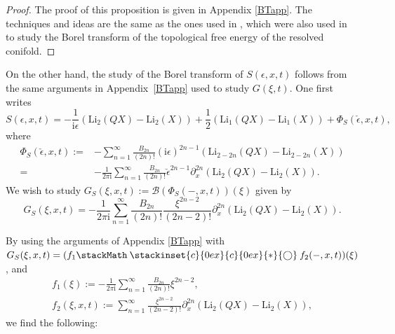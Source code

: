 \documentclass[pdftex]{sigma}
\newcommand\oast{\stackMath\mathbin{\stackinset{c}{0ex}{c}{0ex}{\ast}{\bigcirc}}}
\numberwithin{equation}{section}
\begin{document}
\begin{proof} The proof of this proposition is given in Appendix \ref{BTapp}. The techniques and ideas are the same as the ones used in \cite{garoufalidis2020resurgence}, which were also used in~\cite{ASTT21} to study the Borel transform of the topological free energy of the resolved conifold.
\end{proof}

On the other hand, the study of the Borel transform of $S(\epsilon,x,t)$ follows from the same arguments in Appendix~\ref{BTapp} used to study $G(\xi,t)$. One first writes
\begin{equation*}
 S(\epsilon,x,t)=-\frac{1}{\mathrm{i}\epsilon}(\mathrm{Li}_2(QX)-\mathrm{Li}_2(X)) +\frac{1}{2}(\mathrm{Li}_1(QX)-\mathrm{Li}_1(X)) + \Phi_S(\check\epsilon,x,t),
\end{equation*}
where
\begin{align*}
 \Phi_S(\check\epsilon,x,t):={}&{-}\sum_{n=1}^{\infty}\frac{B_{2n}}{(2n)!}(\mathrm{i}\epsilon)^{2n-1}(\mathrm{Li}_{2-2n}(QX)-\mathrm{Li}_{2-2n}(X))\\
={}&{-}\frac{1}{2\pi \mathrm{i}}\sum_{n=1}^{\infty}\frac{B_{2n}}{(2n)!}\check{\epsilon}^{2n-1}\partial_x^{2n}(\mathrm{Li}_{2}(QX)-\mathrm{Li}_{2}(X)).
 \end{align*}
We wish to study $G_S(\xi,x,t):=\mathcal{B}(\Phi_S(-,x,t))(\xi)$ given by
\begin{equation}\label{BoreltransS}
 G_S(\xi,x,t)=-\frac{1}{2\pi \mathrm{i}}\sum_{n=1}^{\infty}\frac{B_{2n}}{(2n)!}\frac{\xi^{2n-2}}{(2n-2)!}\partial_x^{2n}(\mathrm{Li}_{2}(QX)-\mathrm{Li}_{2}(X)).
\end{equation}

By using the arguments of Appendix \ref{BTapp} with $G_S(\xi,x,t)=(f_1\oast f_2(-,x,t))(\xi)$, and
\begin{gather*}
 f_1(\xi):=-\frac{1}{2\pi \mathrm{i}}\sum_{n=1}^{\infty}\frac{B_{2n}}{(2n)!}\xi^{2n-2},\\
 f_2(\xi,x,t):=\sum_{n=1}^{\infty}\frac{\xi^{2n-2}}{(2n-2)!}\partial_x^{2n}(\mathrm{Li}_{2}(QX)-\mathrm{Li}_{2}(X)),
 \end{gather*}
we find the following:
\end{document}
